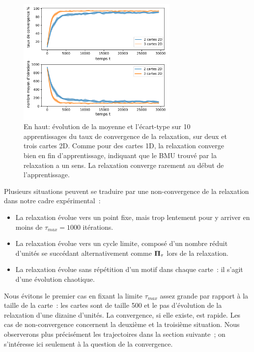 \documentclass[../main]{subfiles}
\begin{document}
\begin{figure}
	\centering
	\includegraphics[width=0.7\textwidth]{2D_conv_evolution_total_french.pdf}
	\caption{En haut: évolution de la moyenne et l'écart-type sur 10 apprentissages du taux de convergence de la relaxation, sur deux et trois cartes 2D. 
	Comme pour des cartes 1D, la relaxation converge bien en fin d'apprentissage, indiquant que le BMU trouvé par la relaxation a un sens. La relaxation converge rarement au début de l'apprentissage.}
	\label{fig:conv_evolution2D}
	\end{figure}

Plusieurs situations peuvent se traduire par une non-convergence de la relaxation dans notre cadre expérimental~:
\begin{itemize}
\item La relaxation évolue vers un point fixe, mais trop lentement pour y arriver en moins de $\tau_{max} = 1000$ itérations.
\item La relaxation évolue vers un cycle limite, composé d'un nombre réduit d'unités se succédant alternativement comme $\mathbf{\Pi_\tau}$ lors de la relaxation.
\item La relaxation évolue sans répétition d'un motif dans chaque carte~: il s'agit d'une évolution chaotique.
\end{itemize}

Nous évitons le premier cas en fixant la limite $\tau_{max}$ assez grande par rapport à la taille de la carte~: les cartes sont de taille 500 et le pas d'évolution de la relaxation d'une dizaine d'unités. 
La convergence, si elle existe, est rapide. Les cas de non-convergence concernent la deuxième et la troisième situation. 
Nous observerons plus précisément les trajectoires dans la section suivante~; on s'intéresse ici seulement à la question de la convergence.
\end{document}
